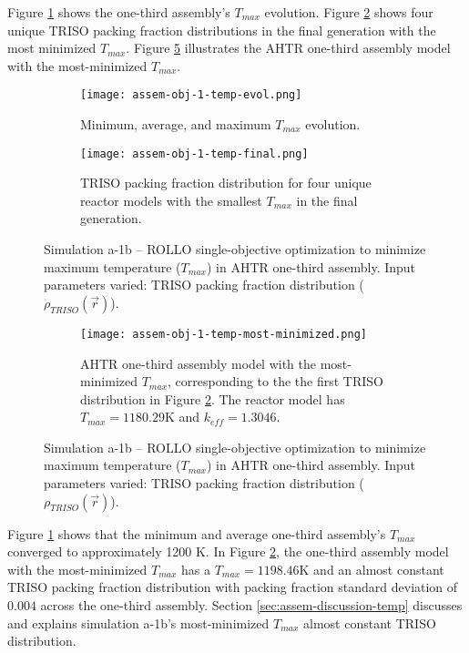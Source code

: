 Figure \ref{fig:assem-obj-1-temp-evol} shows the one-third assembly's $T_{max}$ 
evolution. 
Figure \ref{fig:assem-obj-1-temp-final} shows four unique TRISO packing fraction 
distributions in the final generation with the most minimized $T_{max}$. 
Figure \ref{fig:assem-obj-1-temp-most-minimized} illustrates the \gls{AHTR} one-third 
assembly model with the most-minimized $T_{max}$. 
\begin{figure}[htbp!]
    \begin{subfigure}{\textwidth}
        \centering
        \texttt{[image: assem-obj-1-temp-evol.png]}
        \caption{Minimum, average, and maximum $T_{max}$ evolution.}
        \label{fig:assem-obj-1-temp-evol} 
    \end{subfigure}
    \begin{subfigure}{\textwidth}
        \centering
        \texttt{[image: assem-obj-1-temp-final.png]}
        \caption{TRISO packing fraction distribution for four unique reactor models with the 
        smallest $T_{max}$ in the final generation.}
        \label{fig:assem-obj-1-temp-final} 
    \end{subfigure}
    \caption{Simulation a-1b -- ROLLO single-objective optimization to minimize maximum 
    temperature ($T_{max}$) in \gls{AHTR} one-third assembly. 
    Input parameters varied: \gls{TRISO} packing fraction distribution 
    ($\rho_{TRISO}(\vec{r})$).}
    \label{fig:assem-obj-1-temp}
\end{figure}
\begin{figure}[htbp!]
    \ContinuedFloat
    \begin{subfigure}{\textwidth}
        \centering
        \texttt{[image: assem-obj-1-temp-most-minimized.png]}
        \caption{\gls{AHTR} one-third assembly model with the most-minimized 
        $T_{max}$, corresponding to the the first TRISO distribution in Figure 
        \ref{fig:assem-obj-1-temp-final}. The reactor model has $T_{max}=1180.29$K
        and $k_{eff}=1.3046$.}
        \label{fig:assem-obj-1-temp-most-minimized} 
    \end{subfigure}
    \caption{Simulation a-1b -- ROLLO single-objective optimization to minimize maximum 
    temperature ($T_{max}$) in \gls{AHTR} one-third assembly. 
    Input parameters varied: \gls{TRISO} packing fraction distribution 
    ($\rho_{TRISO}(\vec{r})$).}
\end{figure}

Figure \ref{fig:assem-obj-1-temp-evol} shows that the minimum and average one-third 
assembly's $T_{max}$ converged to approximately 1200 K.
In Figure \ref{fig:assem-obj-1-temp-final}, the one-third assembly model with the 
most-minimized $T_{max}$ has a $T_{max}=1198.46$K and an almost constant TRISO packing 
fraction distribution with packing fraction standard deviation of $0.004$ across the 
one-third assembly. 
Section \ref{sec:assem-discussion-temp} discusses and explains simulation a-1b's 
most-minimized $T_{max}$ almost constant TRISO distribution. 

